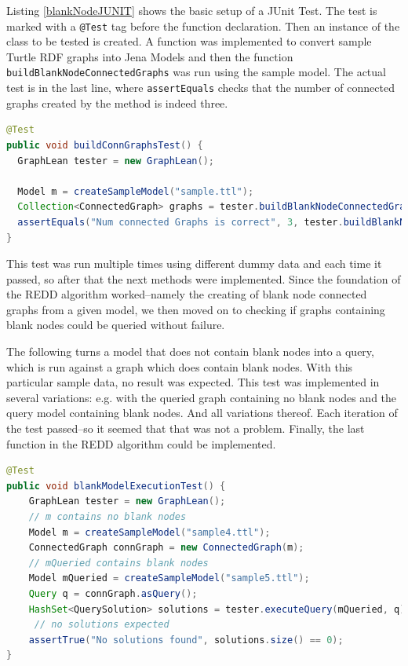 Listing \ref{blankNodeJUNIT} shows the basic setup of a JUnit Test. The test is marked with a \texttt{@Test} tag before the function declaration. Then an instance of the class to be tested is created. A function was implemented to convert sample Turtle RDF graphs into Jena Models and then the function \texttt{buildBlankNodeConnectedGraphs} was run using the sample model. The actual test is in the last line, where \texttt{assertEquals} checks that the number of connected graphs created by the method is indeed three.

\begin{lstlisting}[language=JAVA, caption={A trivial test, that checks the correct number of connected graphs in a sample graph is correct for the sample data, in this case sample.ttl contains 3 connected subgraphs.}, label={blankNodeJUNIT}, tabsize=2, breaklines=true, frame=single]
@Test
public void buildConnGraphsTest() {
  GraphLean tester = new GraphLean();

  Model m = createSampleModel("sample.ttl");
  Collection<ConnectedGraph> graphs = tester.buildBlankNodeConnectedGraphs(m);
  assertEquals("Num connected Graphs is correct", 3, tester.buildBlankNodeConnectedGraphs(m).size());
}
\end{lstlisting}
\vspace{.5cm}

This test was run multiple times using different dummy data and each time it passed, so after that the next methods were implemented. Since the foundation of the REDD algorithm worked--namely the creating of blank node connected graphs from a given model, we then moved on to checking if graphs containing blank nodes could be queried without failure.

The following turns a model that does not contain blank nodes into a query, which is run against a graph which does contain blank nodes. With this particular sample data, no result was expected. This test was implemented in several variations: e.g. with the queried graph containing no blank nodes and the query model containing blank nodes. And all variations thereof. Each iteration of the test passed--so it seemed that that was not a problem. Finally, the last function in the REDD algorithm could be implemented.


\begin{lstlisting}[language=JAVA, caption={This test checks if a model containing blank nodes can be queried without returning an error.}, tabsize=2, breaklines=true, frame=single]
@Test
public void blankModelExecutionTest() {
	GraphLean tester = new GraphLean();
	// m contains no blank nodes
	Model m = createSampleModel("sample4.ttl");
	ConnectedGraph connGraph = new ConnectedGraph(m);
	// mQueried contains blank nodes
	Model mQueried = createSampleModel("sample5.ttl");
	Query q = connGraph.asQuery();
	HashSet<QuerySolution> solutions = tester.executeQuery(mQueried, q);
     // no solutions expected
	assertTrue("No solutions found", solutions.size() == 0);
}
\end{lstlisting}
\vspace{.5cm}

